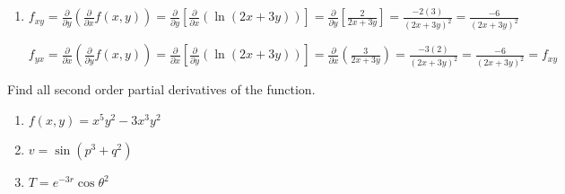 \begin{Answer}[ref=clairaut]
\begin{enumerate}
    $f_{yx} = \frac{\partial}{\partial x} \left( \frac{\partial}{\partial y} 
    f(x, y) \right) = \frac{\partial}{\partial x} \left[ \frac{\partial}{
    \partial y} \left( \frac{x^2}{x + y} \right) \right] = \frac{\partial}{
    \partial x} \left[ \frac{-x^2}{\left( x + y \right)^2} \right] = \frac{
    \left(x + y \right)^2 \left( -2x \right) - \left( -x^2 \right) \left( 2 
    (x + y ) \right)}{\left( x + y \right)^4} = \frac{\left(x^2 + 2xy + y^2 
    \right) \left(-2x \right) + x^2 \left(2x + 2y \right)}{\left( x + y \right)
    ^4} = \frac{-2x^3 - 4x^2y - 2xy^2 + 2x^3 + 2x^2y}{\left( x + y \right)^4} =
    \frac{-2x^2y - 2xy^2}{\left( x + y \right)^4} = f_{xy}$

    \item $f_{xy} = \frac{\partial}{\partial y} \left( \frac{\partial}{
    \partial x}f(x, y) \right) = \frac{\partial}{\partial y} \left[ \frac{
    \partial}{\partial x} \left( \ln{\left(2x + 3y \right)} \right) \right] = 
    \frac{\partial}{\partial y} \left[ \frac{2}{2x + 3y} \right] = \frac{-2 
    \left( 3 \right)}{ \left( 2x + 3y \right)^2} = \frac{-6}{\left( 2x + 3y 
    \right)^2}$

    $f_{yx} = \frac{\partial}{\partial x} \left( \frac{\partial}{\partial y}
    f(x, y) \right) = \frac{\partial}{\partial x} \left[ \frac{\partial}{
    \partial y} \left( \ln{ \left( 2x + 3y \right)} \right) \right] = \frac{
    \partial}{\partial x} \left( \frac{3}{2x + 3y} \right) = \frac{-3(2)}{
    \left( 2x + 3y \right)^2} = \frac{-6}{\left( 2x + 3y \right)^2} = f_{xy}$
\end{enumerate}
\end{Answer}

\begin{Exercise}[title = {Second Order Partial Derivatives}, label = second]
Find all second order partial derivatives of the function. 
\begin{enumerate}
\item $f(x, y) = x^5y^2 - 3x^3y^2$
\item $v = \sin{\left( p^3 + q^2 \right)}$
\item $T = e^{-3r} \cos{\theta^2}$
\end{enumerate}
\end{Exercise}

